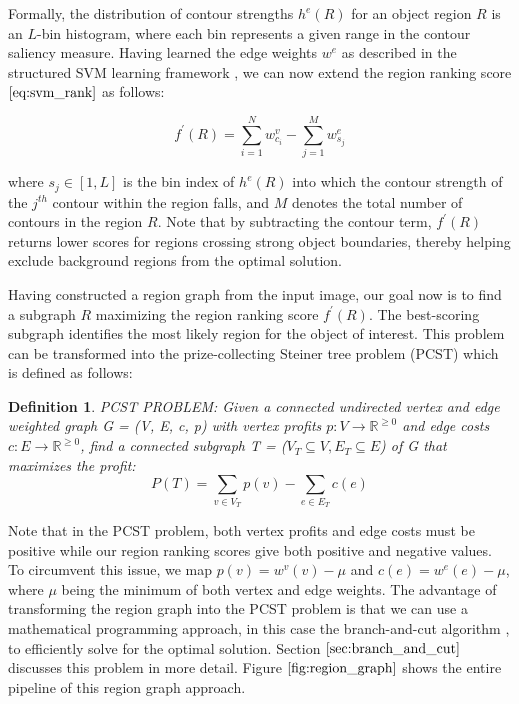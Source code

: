 \documentclass{SMBV12}
\newtheorem{definition}{Definition}
\begin{document}
Formally, the distribution of contour strengths $h^e(R)$ for an object region $R$ is an $L$-bin histogram, where each bin represents a given range in the contour saliency measure. Having learned the edge weights $w^e$ as described in the structured SVM learning framework \cite{tsochantaridis2006large}, we can now extend the region ranking score $\ref{eq:svm_rank}$ as follows:

\begin{equation}
f^{\prime}(R) = \sum\limits_{i = 1}^{N} w^v_{c_i} - \sum\limits_{j = 1}^{M} w^e_{s_j}
\end{equation}

where $s_j \in [1, L]$ is the bin index of $h^e(R)$ into which the contour strength of the $j^{th}$ contour within the region falls, and $M$ denotes the total number of contours in the region $R$. Note that by subtracting the contour term, $f^{\prime}(R)$ returns lower scores for regions crossing strong object boundaries, thereby helping exclude background regions from the optimal solution.

Having constructed a region graph from the input image, our goal now is to find a subgraph $R$ maximizing the region ranking score $f^\prime(R)$. The best-scoring subgraph identifies the most likely region for the object of interest. This problem can be transformed into the prize-collecting Steiner tree problem (PCST) which is defined as follows:

\begin{definition}
PCST PROBLEM: Given a connected undirected vertex and edge weighted graph G = (V, E, c, p) with vertex profits $p: V \rightarrow \mathbb{R}^{\geq 0}$ and edge costs $c: E \rightarrow \mathbb{R}^{\geq 0}$, find a connected subgraph T = ($V_T \subseteq V, E_T \subseteq E$) of G that maximizes the profit:
\begin{equation}
P(T) = \sum\limits_{v \in V_T} p(v) - \sum\limits_{e \in E_T} c(e)
\end{equation}
\end{definition}

Note that in the PCST problem, both vertex profits and edge costs must be positive while our region ranking scores give both positive and negative values. To circumvent this issue, we map $p(v) = w^v(v) - \mu$ and $c(e) = w^e(e) - \mu$, where $\mu$ being the minimum of both vertex and edge weights. The advantage of transforming the region graph into the PCST problem is that we can use a mathematical programming approach, in this case the branch-and-cut algorithm \cite{ljubic2006algorithmic}, to efficiently solve for the optimal solution. Section $\ref{sec:branch_and_cut}$ discusses this problem in more detail. Figure $\ref{fig:region_graph}$ shows the entire pipeline of this region graph approach.
\end{document}

